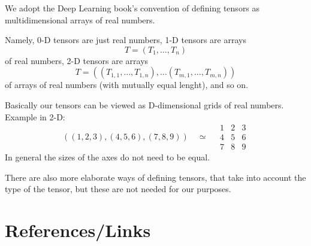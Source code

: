 \documentclass[]{article}
\begin{document}
We adopt the Deep Learning book's convention of defining tensors as
multidimensional arrays of real numbers.

Namely, 0-D tensors are just real numbers, 1-D tensors are arrays
\[
T = (T_1, \ldots, T_n)
\]
of real numbers, 2-D tensors are arrays
\[
T = ((T_{1,1}, \ldots, T_{1,n}), \ldots (T_{m,1}, \ldots, T_{m,n}))
\]
of arrays of real numbers (with mutually equal lenght), and so on.

Basically our tensors can be viewed as D-dimensional grids of real numbers.
Example in 2-D:
\[
((1, 2, 3), (4, 5, 6), (7, 8, 9)) \quad \simeq \quad
\begin{array}{c|c|c}
  1 & 2 & 3 \\
  \hline
  4 & 5 & 6 \\
  \hline
  7 & 8 & 9
 \end{array}
\]
In general the sizes of the axes do not need to be equal.

There are also more elaborate ways of defining tensors, that take into account
the type of the tensor, but these are not needed for our purposes.

\section{References/Links}
\end{document}
